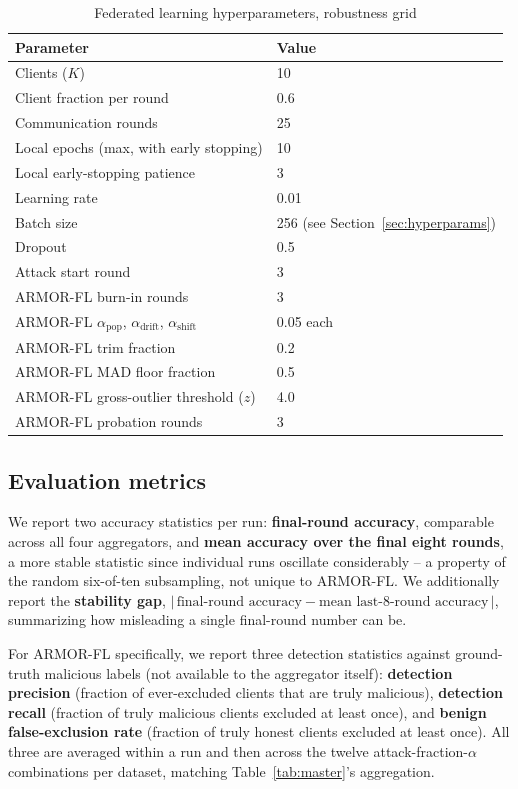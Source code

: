 \documentclass[pdflatex,iicol,sn-mathphys-num]{sn-jnl}%
\theoremstyle{thmstyleone}%
\theoremstyle{thmstyletwo}%
\theoremstyle{thmstylethree}%
\begin{document}
\begin{table}[htbp]
\centering
\caption{Federated learning hyperparameters, robustness grid}\label{tab:hyperparams}
\footnotesize
\begin{tabular}{@{}ll@{}}
\toprule
Parameter & Value \\
\midrule
Clients ($K$) & 10 \\
Client fraction per round & 0.6 \\
Communication rounds & 25 \\
Local epochs (max, with early stopping) & 10 \\
Local early-stopping patience & 3 \\
Learning rate & 0.01 \\
Batch size & 256 (see Section~\ref{sec:hyperparams}) \\
Dropout & 0.5 \\
Attack start round & 3 \\
ARMOR-FL burn-in rounds & 3 \\
ARMOR-FL $\alpha_{\mathrm{pop}}$, $\alpha_{\mathrm{drift}}$, $\alpha_{\mathrm{shift}}$ & 0.05 each \\
ARMOR-FL trim fraction & 0.2 \\
ARMOR-FL MAD floor fraction & 0.5 \\
ARMOR-FL gross-outlier threshold ($z$) & 4.0 \\
ARMOR-FL probation rounds & 3 \\
\bottomrule
\end{tabular}
\end{table}

\subsection{Evaluation metrics}\label{sec:metrics}

We report two accuracy statistics per run: \textbf{final-round accuracy}, comparable across all four aggregators, and \textbf{mean accuracy over the final eight rounds}, a more stable statistic since individual runs oscillate considerably -- a property of the random six-of-ten subsampling, not unique to ARMOR-FL. We additionally report the \textbf{stability gap}, $|\,\text{final-round accuracy} - \text{mean last-8-round accuracy}\,|$, summarizing how misleading a single final-round number can be.

For ARMOR-FL specifically, we report three detection statistics against ground-truth malicious labels (not available to the aggregator itself): \textbf{detection precision} (fraction of ever-excluded clients that are truly malicious), \textbf{detection recall} (fraction of truly malicious clients excluded at least once), and \textbf{benign false-exclusion rate} (fraction of truly honest clients excluded at least once). All three are averaged within a run and then across the twelve attack-fraction-$\alpha$ combinations per dataset, matching Table~\ref{tab:master}'s aggregation.
\end{document}
